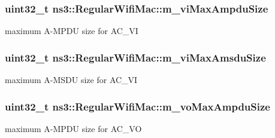 \subsubsection[{\texorpdfstring{m\+\_\+vi\+Max\+Ampdu\+Size}{m_viMaxAmpduSize}}]{\setlength{\rightskip}{0pt plus 5cm}uint32\+\_\+t ns3\+::\+Regular\+Wifi\+Mac\+::m\+\_\+vi\+Max\+Ampdu\+Size\hspace{0.3cm}{\ttfamily [private]}}\hypertarget{classns3_1_1RegularWifiMac_afe46a30087d220d0ec9fb5ec635b4ae1}{}\label{classns3_1_1RegularWifiMac_afe46a30087d220d0ec9fb5ec635b4ae1}


maximum A-\/\+M\+P\+DU size for A\+C\+\_\+\+VI 

\subsubsection[{\texorpdfstring{m\+\_\+vi\+Max\+Amsdu\+Size}{m_viMaxAmsduSize}}]{\setlength{\rightskip}{0pt plus 5cm}uint32\+\_\+t ns3\+::\+Regular\+Wifi\+Mac\+::m\+\_\+vi\+Max\+Amsdu\+Size\hspace{0.3cm}{\ttfamily [private]}}\hypertarget{classns3_1_1RegularWifiMac_a6a9e67fe94f116dc764c640e38f59a62}{}\label{classns3_1_1RegularWifiMac_a6a9e67fe94f116dc764c640e38f59a62}


maximum A-\/\+M\+S\+DU size for A\+C\+\_\+\+VI 

\subsubsection[{\texorpdfstring{m\+\_\+vo\+Max\+Ampdu\+Size}{m_voMaxAmpduSize}}]{\setlength{\rightskip}{0pt plus 5cm}uint32\+\_\+t ns3\+::\+Regular\+Wifi\+Mac\+::m\+\_\+vo\+Max\+Ampdu\+Size\hspace{0.3cm}{\ttfamily [private]}}\hypertarget{classns3_1_1RegularWifiMac_ab4c2cdda812a7aa484b9735c720a32fe}{}\label{classns3_1_1RegularWifiMac_ab4c2cdda812a7aa484b9735c720a32fe}


maximum A-\/\+M\+P\+DU size for A\+C\+\_\+\+VO 

